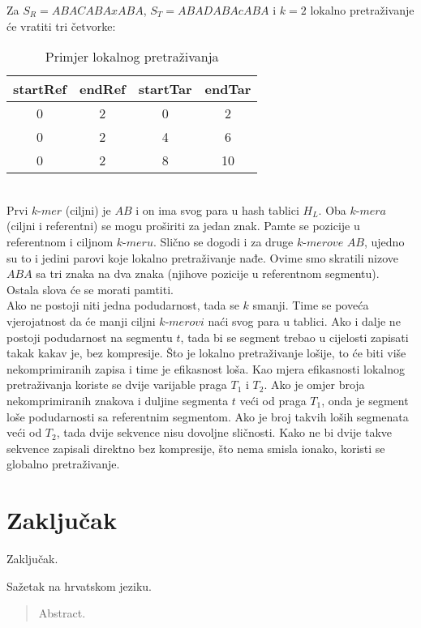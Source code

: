\documentclass[times, utf8, diplomski]{fer}
\begin{document}
Za $\textit{S}_R = ABACABAxABA$, $\textit{S}_T = ABADABAcABA$ i $k = 2$ lokalno pretraživanje će vratiti tri četvorke:\\
\begin{table} [!h]
\centering
\begin{tabular}{|c | c | c | c|}
\hline
startRef & endRef & startTar & endTar \\
\hline
0 & 2 & 0 & 2\\
\hline
0 & 2 & 4 & 6\\
\hline 
0 & 2 & 8 & 10 \\
\hline
\end{tabular}
\caption{Primjer lokalnog pretraživanja}
\end{table}\\
Prvi $\textit{k-mer}$ (ciljni) je $AB$ i on ima svog para u hash tablici $\textit{H}_L$. Oba $\textit{k-mera}$ (ciljni i referentni) se mogu proširiti za jedan znak. Pamte se pozicije u referentnom i ciljnom $\textit{k-meru}$. Slično se dogodi i za druge $\textit{k-merove}$ $AB$, ujedno su to i jedini parovi koje lokalno pretraživanje nađe. Ovime smo skratili nizove $ABA$ sa tri znaka na dva znaka (njihove pozicije u referentnom segmentu). Ostala slova će se morati pamtiti.\\
Ako ne postoji niti jedna podudarnost, tada se $k$ smanji. Time se poveća vjerojatnost da će manji ciljni $\textit{k-merovi}$ naći svog para u tablici. Ako i dalje ne postoji podudarnost na segmentu $t$, tada bi se segment trebao u cijelosti zapisati takak kakav je, bez kompresije. Što je lokalno pretraživanje lošije, to će biti više nekomprimiranih zapisa i time je efikasnost loša. Kao mjera efikasnosti lokalnog pretraživanja koriste se dvije varijable praga $T_1$ i $T_2$. Ako je omjer broja nekomprimiranih znakova i duljine segmenta $t$ veći od praga $T_1$, onda je segment loše podudarnosti sa referentnim segmentom. Ako je broj takvih loših segmenata veći od $T_2$, tada dvije sekvence nisu dovoljne sličnosti. Kako ne bi dvije takve sekvence zapisali direktno bez kompresije, što nema smisla ionako, koristi se globalno pretraživanje.

\chapter{Zaključak}
Zaključak.

\nocite{*}



\begin{sazetak}
Sažetak na hrvatskom jeziku.

\end{sazetak}

\begin{abstract}
Abstract.

\end{abstract}
\end{document}
